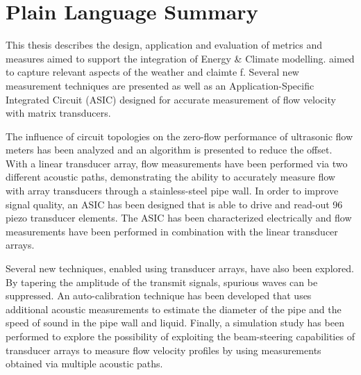 \documentclass[]{dissertation}
\begin{document}
\section*{Plain Language Summary}
This thesis describes the design, application and evaluation of metrics and measures aimed to support the integration of Energy  \& Climate modelling. aimed to capture relevant aspects of the weather and claimte f. Several new measurement techniques are presented as well as an Application-Specific Integrated Circuit (ASIC) designed for accurate measurement of flow velocity with matrix transducers.

The influence of circuit topologies on the zero-flow performance of ultrasonic flow meters has been analyzed and an algorithm is presented to reduce the offset. With a linear transducer array, flow measurements have been performed via two different acoustic paths, demonstrating the ability to accurately measure flow with array transducers through a stainless-steel pipe wall. In order to improve signal quality, an ASIC has been designed that is able to drive and read-out 96 piezo transducer elements. The ASIC has been characterized electrically and flow measurements have been performed in combination with the linear transducer arrays.

Several new techniques, enabled using transducer arrays, have also been explored. By tapering the amplitude of the transmit signals, spurious waves can be suppressed. An auto-calibration technique has been developed that uses additional acoustic measurements to estimate the diameter of the pipe and the speed of sound in the pipe wall and liquid. Finally, a simulation study has been performed to explore the possibility of exploiting the beam-steering capabilities of transducer arrays to measure flow velocity profiles by using measurements obtained via multiple acoustic paths.


\newpage
\chaptoc







\cleardoublepage


\end{document}
